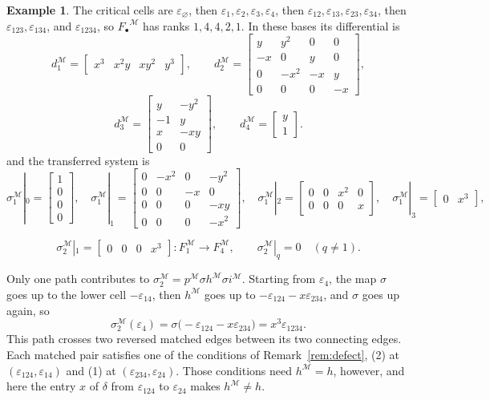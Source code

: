 \documentclass[12pt]{amsart}
\theoremstyle{plain}
\theoremstyle{definition}
\newtheorem{example}[theorem]{Example}
\newcommand{\F}{ {F_\bullet} }
\newcommand{\M}{\mathcal{M}}
\newcommand{\eps}{\varepsilon}
\begin{document}
\begin{example}
    The critical cells are $\eps_\varnothing$, then $\eps_1, \eps_2, \eps_3, \eps_4$, then $\eps_{12}, \eps_{13}, \eps_{23}, \eps_{34}$, then $\eps_{123}, \eps_{134}$, and $\eps_{1234}$, so $\F^{\M}$ has ranks $1, 4, 4, 2, 1$. In these bases its differential is
    \[
        d^{\M}_1 = \begin{bmatrix} x^3 & x^2y & xy^2 & y^3 \end{bmatrix}, \qquad
        d^{\M}_2 = \begin{bmatrix} y & y^2 & 0 & 0\\ -x & 0 & y & 0\\ 0 & -x^2 & -x & y\\ 0 & 0 & 0 & -x \end{bmatrix},
    \]
    \[
        d^{\M}_3 = \begin{bmatrix} y & -y^2\\ -1 & y\\ x & -xy\\ 0 & 0 \end{bmatrix}, \qquad
        d^{\M}_4 = \begin{bmatrix} y\\ 1 \end{bmatrix}.
    \]
    and the transferred system is
    \[
        \sigma^{\M}_1|_0 = \begin{bmatrix} 1\\ 0\\ 0\\ 0 \end{bmatrix}, \quad
        \sigma^{\M}_1|_1 = \begin{bmatrix} 0 & -x^2 & 0 & -y^2\\ 0 & 0 & -x & 0\\ 0 & 0 & 0 & -xy\\ 0 & 0 & 0 & -x^2 \end{bmatrix}, \quad
        \sigma^{\M}_1|_2 = \begin{bmatrix} 0 & 0 & x^2 & 0\\ 0 & 0 & 0 & x \end{bmatrix}, \quad
        \sigma^{\M}_1|_3 = \begin{bmatrix} 0 & x^3 \end{bmatrix},
    \]

    \[
        \sigma^{\M}_2|_1 = \begin{bmatrix} 0 & 0 & 0 & x^3 \end{bmatrix} \colon F^{\M}_1 \to F^{\M}_4, \qquad \sigma^{\M}_2|_q = 0 \quad (q \neq 1).
    \]

    Only one path contributes to $\sigma^{\M}_2 = p^{\M} \sigma h^{\M} \sigma i^{\M}$. Starting from $\eps_4$, the map $\sigma$ goes up to the lower cell $-\eps_{14}$, then $h^{\M}$ goes up to $-\eps_{124} - x \eps_{234}$, and $\sigma$ goes up again, so
    \[
        \sigma^{\M}_2(\eps_4) = \sigma\bigl(-\eps_{124} - x\eps_{234}\bigr) = x^3 \eps_{1234} .
    \]
    This path crosses two reversed matched edges between its two connecting edges. Each matched pair satisfies one of the conditions of Remark~\ref{rem:defect}, (2) at $(\eps_{124}, \eps_{14})$ and (1) at $(\eps_{234}, \eps_{24})$. Those conditions need $h^{\M} = h$, however, and here the entry $x$ of $\delta$ from $\eps_{124}$ to $\eps_{24}$ makes $h^{\M} \neq h$.


\end{example}
\end{document}
